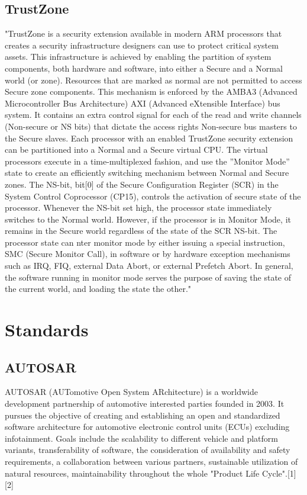 \subsection{TrustZone}
\label{sec:trustzone}
"TrustZone is a security extension available in modern ARM processors that creates a security infrastructure designers can use to protect critical system assets. This infrastructure is achieved by enabling the partition of system components, both hardware and software, into either a Secure and a Normal world (or zone). Resources that are marked as normal are not permitted to access Secure zone components. This mechanism is enforced by the AMBA3 (Advanced Microcontroller Bus Architecture) AXI (Advanced eXtensible Interface) bus system. It contains an extra control signal for each of the read and write channels (Non-secure or NS bits) that dictate the access rights Non-secure bus masters to the Secure slaves. Each processor with an enabled TrustZone security extension can be partitioned into a Normal and a Secure virtual CPU. The virtual processors execute in a time-multiplexed fashion, and use the ”Monitor Mode” state to create an efficiently switching mechanism between Normal and Secure zones. The NS-bit, bit[0] of the Secure Configuration Register (SCR) in the System Control Coprocessor (CP15), controls the activation of secure state of the processor. Whenever the NS-bit set high, the processor state immediately switches to the Normal world. However, if the processor is in Monitor Mode, it remains in the Secure world regardless of the state of the SCR NS-bit. The processor state can nter monitor mode by either issuing a special instruction, SMC (Secure Monitor Call), in software or by hardware exception mechanisms such as IRQ, FIQ, external Data Abort, or external Prefetch Abort. In general, the software running in monitor mode serves the purpose of saving the state of the current world, and loading the state the other."~\cite{website:ARM} \\ %

\section{Standards}

\subsection{AUTOSAR}
AUTOSAR (AUTomotive Open System ARchitecture) is a worldwide development partnership of automotive interested parties founded in 2003. It pursues the objective of creating and establishing an open and standardized software architecture for automotive electronic control units (ECUs) excluding infotainment. Goals include the scalability to different vehicle and platform variants, transferability of software, the consideration of availability and safety requirements, a collaboration between various partners, sustainable utilization of natural resources, maintainability throughout the whole "Product Life Cycle".[1][2]

